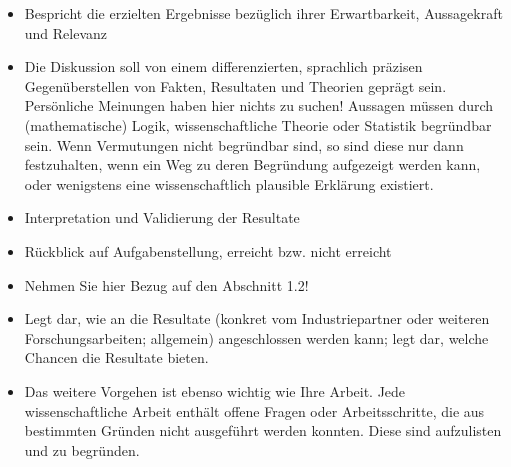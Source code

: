 \begin{itemize}
    \item Bespricht die erzielten Ergebnisse bezüglich ihrer Erwartbarkeit, Aussagekraft und Relevanz
    \item Die Diskussion soll von einem differenzierten, sprachlich präzisen Gegenüberstellen von Fakten, Resultaten und Theorien geprägt sein. Persönliche Meinungen haben hier nichts zu suchen! Aussagen müssen durch (mathematische) Logik, wissenschaftliche Theorie oder Statistik begründbar sein. Wenn Vermutungen nicht begründbar sind, so sind diese nur dann festzuhalten, wenn ein Weg zu deren Begründung aufgezeigt werden kann, oder wenigstens eine wissenschaftlich plausible Erklärung existiert.
    \item Interpretation und Validierung der Resultate
    \item Rückblick auf Aufgabenstellung, erreicht bzw. nicht erreicht
    \item Nehmen Sie hier Bezug auf den Abschnitt 1.2!
    \item Legt dar, wie an die Resultate (konkret vom Industriepartner oder weiteren Forschungsarbeiten; allgemein) angeschlossen werden kann; legt dar, welche Chancen die Resultate bieten.
    \item Das weitere Vorgehen ist ebenso wichtig wie Ihre Arbeit. Jede wissenschaftliche Arbeit enthält offene Fragen oder Arbeitsschritte, die aus bestimmten Gründen nicht ausgeführt werden konnten. Diese sind aufzulisten und zu begründen.
\end{itemize}

\lipsum[1]